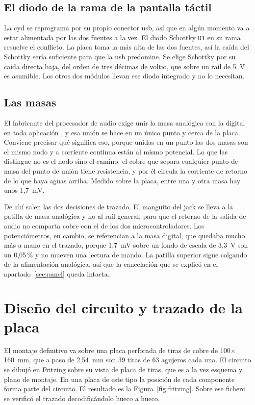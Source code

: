 \subsection*{El diodo de la rama de la pantalla táctil}

La \gls{cyd} se reprograma por su propio conector \gls{usb}, así que en algún
momento va a estar alimentada por las dos fuentes a la vez. El diodo Schottky
\texttt{D1} en su rama resuelve el conflicto. La placa toma la más alta de las 
dos fuentes, así la caída del Schottky sería suficiente para que la \gls{usb} predomine.
Se elige Schottky por su caída directa baja, del orden de tres décimas de
voltio, que sobre un raíl de 5~V es asumible. Los otros dos módulos llevan ese
diodo integrado y no lo necesitan.

\subsection*{Las masas}

El fabricante del procesador de audio exige unir la masa analógica con la
digital en toda aplicación \cite{DaisySeed}, y esa unión se hace en un único
punto y cerca de la placa. Conviene precisar qué significa eso, porque unidas en
un punto las dos masas son el mismo nodo y a corriente continua están al mismo
potencial. Lo que las distingue no es el nodo sino el camino: el cobre que
separa cualquier punto de masa del punto de unión tiene resistencia, y por él
circula la corriente de retorno de lo que haya aguas arriba. Medido sobre la
placa, entre una y otra masa hay unos 1,7~mV.

De ahí salen las dos decisiones de trazado. El manguito del jack se lleva a la
patilla de masa analógica y no al raíl general, para que el retorno de la salida
de audio no comparta cobre con el de los dos microcontroladores. Los
potenciómetros, en cambio, se referencian a la masa digital, que quedaba mucho
más a mano en el trazado, porque 1,7~mV sobre un fondo de escala de 3,3~V son un
0,05\,\% y no mueven una lectura de mando. La patilla superior sigue colgando de
la alimentación analógica, así que la cancelación que se explicó en el
apartado~\ref{sec:panel} queda intacta.

\section{Diseño del circuito y trazado de la placa}
\label{sec:veroboard}

El montaje definitivo va sobre una placa perforada de tiras de cobre de
100$\times$160~mm, que a paso de 2,54~mm son 39 tiras de 63 agujeros cada una.
El circuito se dibujó en Fritzing sobre su vista de placa de tiras, que es a la
vez esquema y plano de montaje. En una placa de este tipo la posición de
cada componente forma parte del circuito. El resultado es la
Figura~\ref{fig:fritzing}. Sobre ese fichero se verificó el trazado
decodificándolo hueco a hueco.

